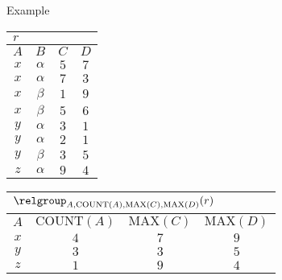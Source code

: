 \begin{multicols}{2}
\begin{CheatsheetEntryFrame}
        \SubsectionFrameAddSeparation
        \begin{RelAlgSubsection}{Example}
        \begin{center}
            {\footnotesize%
                \begin{tabular}{|cccc|}
                    \multicolumn{4}{l}{\normalsize $r$}
                        \\ \hline
                    \multicolumn{1}{|c}{$A$}
                        & \multicolumn{1}{c}{$B$}
                        & \multicolumn{1}{c}{$C$}
                        & \multicolumn{1}{c|}{$D$}
                        \\ \hline\hline
                    $x$ & $\alpha$ & $5$ & $7$ \\
                    $x$ & $\alpha$ & $7$ & $3$ \\
                    $x$ & $\beta $ & $1$ & $9$ \\
                    $x$ & $\beta $ & $5$ & $6$ \\
                    $y$ & $\alpha$ & $3$ & $1$ \\
                    $y$ & $\alpha$ & $2$ & $1$ \\
                    $y$ & $\beta $ & $3$ & $5$ \\
                    $z$ & $\alpha$ & $9$ & $4$ \\ \hline
                \end{tabular}

                \begin{tabular}{|cccc|}
                    \multicolumn{4}{l}{\normalsize $\relgroup_{A, \text{COUNT}(A), \text{MAX}(C), \text{MAX}(D)}{(r)}$}
                        \\ \hline
                    \multicolumn{1}{|c}{$A$}
                        & \multicolumn{1}{c}{$\text{COUNT}(A)$}
                        & \multicolumn{1}{c}{$\text{MAX}(C)$}
                        & \multicolumn{1}{c|}{$\text{MAX}(D)$}
                        \\ \hline\hline
                    $x$ & $4$ & $7$ & $9$ \\
                    $y$ & $3$ & $3$ & $5$ \\
                    $z$ & $1$ & $9$ & $4$ \\ \hline
                \end{tabular}

}
\end{center}
\end{RelAlgSubsection}
\end{CheatsheetEntryFrame}
\end{multicols}
